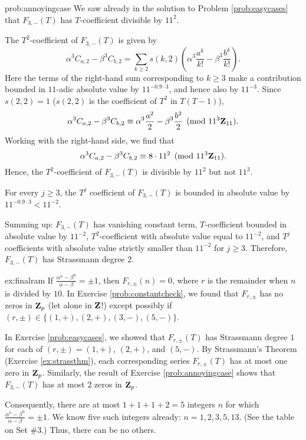 \begin{sol}{prob:annoyingcase} We saw already in the solution to Problem \ref{prob:easycases} that $F_{3,-}(T)$ has $T$-coefficient divisible by $11^2$. 

The $T^2$-coefficient of $F_{3,-}(T)$  is given by
\[ \alpha^3 C_{a,2} - \beta^3 C_{b,2} = \sum_{k\ge 2} s(k,2) \left(\alpha^3 \frac{a^k}{k!} - \beta^3 \frac{b^k}{k!}\right). \]
Here the terms of the right-hand sum corresponding to $k\ge 3$ make a contribution bounded in $11$-adic absolute value by $11^{-0.9\cdot 3}$, and hence also by $11^{-3}$. Since $s(2,2)=1$ ($s(2,2)$ is the coefficient of $T^2$ in $T(T-1)$), 
\[ \alpha^3 C_{a,2} - \beta^3 C_{b,2} \equiv \alpha^3 \frac{a^2}{2} - \beta^3 \frac{b^2}{2} \pmod{11^3 \mathbf{Z}_{11}}. \]
Working with the right-hand side, we find that
\[ \alpha^3 C_{a,2} - \beta^3 C_{b,2} \equiv 8\cdot 11^2\pmod{11^3\mathbf{Z}_{11}}.\]
Hence, the $T^2$-coefficient of $F_{3,-}(T)$ is divisible by $11^2$ but not $11^3$.

For every $j\ge 3$, the $T^j$ coefficient of $F_{3,-}(T)$ is bounded in absolute value by $11^{-0.9\cdot 3} < 11^{-2}$. 

Summing up: $F_{3,-}(T)$ has vanishing constant term, $T$-coefficient bounded in absolute value by $11^{-2}$, $T^2$-coefficient with absolute value equal to $11^{-2}$, and $T^j$ coefficients with absolute value strictly smaller than $11^{-2}$ for $j\ge 3$. Therefore, $F_{3,-}(T)$ has Strassmann degree $2$.
\end{sol}

\begin{sol}{ex:finalram} If $\frac{\alpha^n-\beta^n}{\alpha-\beta}=\pm 1$, then $F_{r,\pm}(n)=0$, where $r$ is the remainder when $n$ is divided by $10$. In Exercise \ref{prob:constantcheck}, we found that $F_{r,\pm}$ has no zeros in $\mathbf{Z}_p$ (let alone in $\mathbf{Z}$!) except possibly if $(r,\pm) \in \{(1,+), (2,+), (3,-), (5,-)\}$.

In Exercise \ref{prob:easycases}, we showed that $F_{r,\pm}(T)$ has Strassmann degree $1$ for each of $(r,\pm)= (1,+)$, $(2,+)$, and $(5,-)$. By Strassmann's Theorem (Exercise \ref{ex:strassthm}), each corresponding series $F_{r,\pm}(T)$ has at most one zero in $\mathbf{Z}_p$. Similarly, the result of Exercise \ref{prob:annoyingcase} shows that $F_{3,-}(T)$ has at most $2$ zeros in $\mathbf{Z}_p$.

Consequently, there are at most $1+1+1+2 = 5$ integers $n$ for which $\frac{\alpha^n-\beta^n}{\alpha-\beta}=\pm 1$. We know five such integers already: $n=1, 2, 3, 5, 13$. (See the table on Set \#3.) Thus, there can be no others.
\end{sol}

